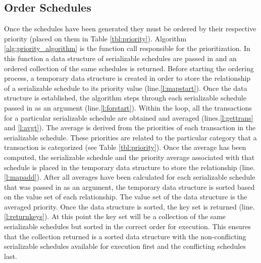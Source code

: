 \documentclass[conference]{IEEEtran}
\begin{document}
\subsection{Order Schedules}
Once the schedules have been generated they must be ordered by their respective priority (placed on them in Table \ref{tbl:priority}). Algorithm \ref{alg:priority_algorithm} is the function call responsible for the prioritization. In this function a data structure of serializable schedules are passed in and an ordered collection of the same schedules is returned. Before starting the ordering process, a temporary data structure is created in order to store the relationship of a serializable schedule to its priority value (line.\ref{l:mapstart}). Once the data structure is established, the algorithm steps through each serializable schedule passed in as an argument (line.\ref{l:forstart}). Within the loop, all the transactions for a particular serializable schedule are obtained and averaged (lines.\ref{l:gettrans} and \ref{l:avgt}). The average is derived from the priorities of each transaction in the serializable schedule. These priorities are related to the particular category that a transaction is categorized (see Table \ref{tbl:priority}). Once the average has been computed, the serializable schedule and the priority average associated with that schedule is placed in the temporary data structure to store the relationship (line.\ref{l:mapadd}). After all averages have been calculated for each serializable schedule that was passed in as an argument, the temporary data structure is sorted based on the value set of each relationship. The value set of the data structure is the averaged priority. Once the data structure is sorted, the key set is returned (line.\ref{l:returnkeys}). At this point the key set will be a collection of the same serializable schedules but sorted in the correct order for execution. This ensures that the collection returned is a sorted data structure with the non-conflicting serializable schedules available for execution first and the conflicting schedules last.
\end{document}

